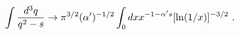 \begin{equation} \label{ftst}
\int {d^3 q\over q^2- s} \rightarrow
\pi^{3/2} (\alpha')^{-1/2}
\int_0 dx x^{-1-\alpha' s} [\ln (1/x)]^{-3/2}\ .
\end{equation}

